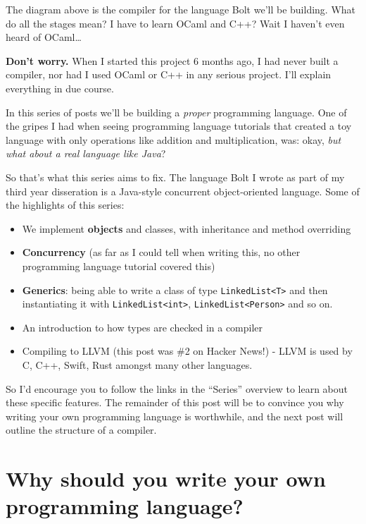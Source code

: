 The diagram above is the compiler for the language Bolt we'll be
building. What do all the stages mean? I have to learn OCaml and C++?
Wait I haven't even heard of OCaml\ldots{}

\textbf{Don't worry.} When I started this project 6 months ago, I had
never built a compiler, nor had I used OCaml or C++ in any serious
project. I'll explain everything in due course.

In this series of posts we'll be building a \emph{proper} programming
language. One of the gripes I had when seeing programming language
tutorials that created a toy language with only operations like addition
and multiplication, was: okay, \emph{but what about a real language like
Java}?

So that's what this series aims to fix. The language Bolt I wrote as
part of my third year disseration is a Java-style concurrent
object-oriented language. Some of the highlights of this series:

\begin{itemize}
\tightlist
\item
  We implement \textbf{objects} and classes, with inheritance and method
  overriding
\item
  \textbf{Concurrency} (as far as I could tell when writing this, no
  other programming language tutorial covered this)
\item
  \textbf{Generics}: being able to write a class of type
  \texttt{LinkedList\textless{}T\textgreater{}} and then instantiating
  it with \texttt{LinkedList\textless{}int\textgreater{}},
  \texttt{LinkedList\textless{}Person\textgreater{}} and so on.
\item
  An introduction to how types are checked in a compiler
\item
  Compiling to LLVM (this post was \#2 on Hacker News!) - LLVM is used
  by C, C++, Swift, Rust amongst many other languages.
\end{itemize}

So I'd encourage you to follow the links in the ``Series'' overview to
learn about these specific features. The remainder of this post will be
to convince you why writing your own programming language is worthwhile,
and the next post will outline the structure of a compiler.

\hypertarget{why-should-you-write-your-own-programming-language}{%
\section{\texorpdfstring{\protect\hyperlink{why-should-you-write-your-own-programming-language}{}Why
should you write your own programming
language?}{Why should you write your own programming language?}}\label{why-should-you-write-your-own-programming-language}}

